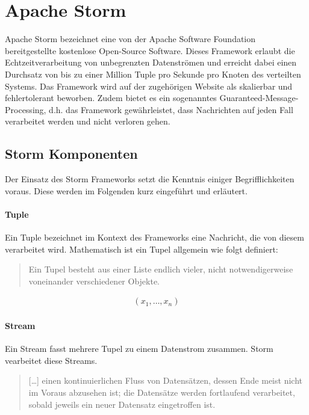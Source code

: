 \documentclass[a4paper,11pt]{scrartcl}
\begin{document}

  \section{Apache Storm}

  Apache Storm bezeichnet eine von der Apache Software Foundation
  bereitgestellte kostenlose Open-Source Software. Dieses Framework
  erlaubt die Echtzeitverarbeitung von unbegrenzten Datenströmen und
  erreicht dabei einen Durchsatz von bis zu einer Million Tuple pro
  Sekunde pro Knoten des verteilten Systems. Das Framework wird auf
  der zugehörigen Website als skalierbar und fehlertolerant beworben.
  Zudem bietet es ein sogenanntes Guaranteed-Message-Processing, d.h.
  das Framework gewährleistet, dass Nachrichten auf jeden Fall
  verarbeitet werden und nicht verloren gehen.\cite{apachestorm}

  \subsection{Storm Komponenten}

  Der Einsatz des Storm Frameworks setzt die Kenntnis einiger
  Begrifflichkeiten voraus. Diese werden im Folgenden kurz eingeführt
  und erläutert.\cite[S.~53ff.]{stormpresentation2011}

  \paragraph{Tuple}
  Ein Tuple bezeichnet im Kontext des Frameworks eine Nachricht, die
  von diesem verarbeitet wird. Mathematisch ist ein Tupel allgemein wie folgt
  definiert:
  \begin{quote}
    Ein Tupel besteht aus einer Liste endlich vieler, nicht
    notwendigerweise voneinander verschiedener Objekte.
  \end{quote}

  \begin{align*}
    (x_1, \ldots , x_n)
  \end{align*}

  \paragraph{Stream}
  Ein Stream fasst mehrere Tupel zu einem Datenstrom zusammen. Storm
  vearbeitet diese Streams.
  \begin{quote}
    [\ldots] einen kontinuierlichen Fluss von Datensätzen, dessen Ende
    meist nicht im Voraus abzusehen ist; die Datensätze werden
    fortlaufend verarbeitet, sobald jeweils ein neuer Datensatz
    eingetroffen ist.
  \end{quote}
\end{document}

